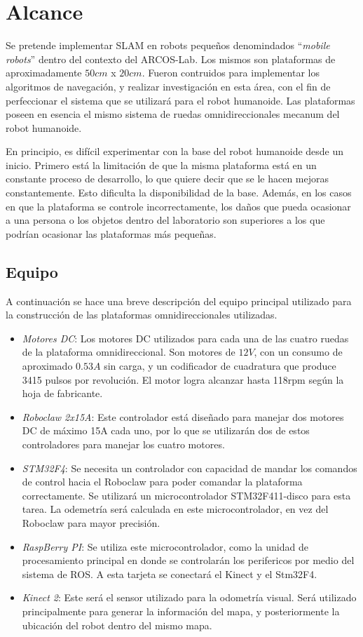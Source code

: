 \newpage
\section{Alcance}
Se pretende implementar SLAM en robots pequeños denomindados ``\textit{mobile robots}'' dentro del contexto del ARCOS-Lab. Los mismos son plataformas de aproximadamente $50cm$ x $20cm$. Fueron contruidos para implementar los algoritmos de navegación, y realizar investigación en esta área, con el fin de perfeccionar el sistema que se utilizará para el robot humanoide. Las plataformas poseen en esencia el mismo sistema de ruedas omnidireccionales mecanum del robot humanoide.

En principio, es difícil experimentar con la base del robot humanoide desde un inicio. Primero está la limitación de que la misma plataforma está en un constante proceso de desarrollo, lo que quiere decir que se le hacen mejoras constantemente. Esto dificulta la disponibilidad de la base. Además, en los casos en que la plataforma se controle incorrectamente, los daños que pueda ocasionar a una persona o los objetos dentro del laboratorio son superiores a los que podrían ocasionar las plataformas más pequeñas.

\subsection{Equipo}
A continuación se hace una breve descripción del equipo principal utilizado para la construcción de las plataformas omnidireccionales utilizadas.

\begin{itemize}
\item \textit{Motores DC}: Los motores DC utilizados para cada una de las cuatro ruedas de la plataforma omnidireccional. Son motores de $12V$, con un consumo de aproximado $0.53A$ sin carga, y un codificador de cuadratura que produce 3415 pulsos por revolución. El motor logra alcanzar hasta 118rpm según la hoja de fabricante.
\item \textit{Roboclaw 2x15A}: Este controlador está diseñado para manejar dos motores DC de máximo 15A cada uno, por lo que se utilizarán dos de estos controladores para manejar los cuatro motores.
\item \textit{STM32F4}: Se necesita un controlador con capacidad de mandar los comandos de control hacia el Roboclaw para poder comandar la plataforma correctamente. Se utilizará un microcontrolador STM32F411-disco para esta tarea. La odemetría será calculada en este microcontrolador, en vez del Roboclaw para mayor precisión.
\item \textit{RaspBerry PI}: Se utiliza este microcontrolador, como la unidad de procesamiento principal en donde se controlarán los perifericos por medio del sistema de ROS. A esta tarjeta se conectará el Kinect y el Stm32F4.
\item \textit{Kinect 2}: Este será el sensor utilizado para la odometría visual. Será utilizado principalmente para generar la información del mapa, y posteriormente la ubicación del robot dentro del mismo mapa.
\end{itemize}

